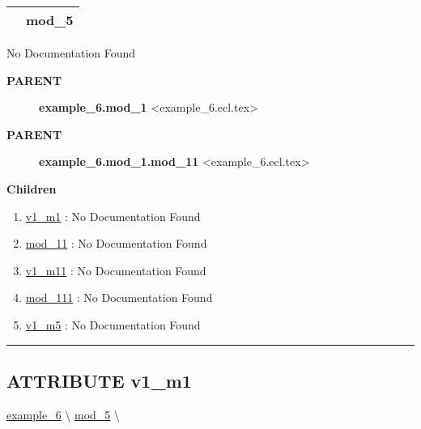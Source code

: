 {\renewcommand{\arraystretch}{1.5}
\begin{tabularx}{\textwidth}{|>{\raggedright\arraybackslash}l|X|}
\hline
\hspace{0pt}\mytexttt{\color{red} } & \textbf{mod\_5} \\
\hline
\end{tabularx}
}

\par





No Documentation Found










\par
\begin{description}
\item [\colorbox{tagtype}{\color{white} \textbf{\textsf{PARENT}}}] \textbf{example\_6.mod\_1} <example\_6.ecl.tex>
\item [\colorbox{tagtype}{\color{white} \textbf{\textsf{PARENT}}}] \textbf{example\_6.mod\_1.mod\_11} <example\_6.ecl.tex>
\end{description}


\textbf{Children}
\begin{enumerate}
\item \hyperlink{ecldoc:example_6.mod_1.v1_m1}{v1\_m1}
: No Documentation Found
\item \hyperlink{ecldoc:example_6.mod_1.mod_11}{mod\_11}
: No Documentation Found
\item \hyperlink{ecldoc:example_6.mod_1.mod_11.v1_m11}{v1\_m11}
: No Documentation Found
\item \hyperlink{ecldoc:example_6.mod_1.mod_11.mod_111}{mod\_111}
: No Documentation Found
\item \hyperlink{ecldoc:example_6.mod_5.v1_m5}{v1\_m5}
: No Documentation Found
\end{enumerate}

\rule{\linewidth}{0.5pt}

\subsection*{\textsf{\colorbox{headtoc}{\color{white} ATTRIBUTE}
v1\_m1}}

\hypertarget{ecldoc:example_6.mod_1.v1_m1}{}
\hspace{0pt} \hyperlink{ecldoc:example_6}{example_6} \textbackslash 
\hspace{0pt} \hyperlink{ecldoc:example_6.mod_5}{mod_5} \textbackslash 

